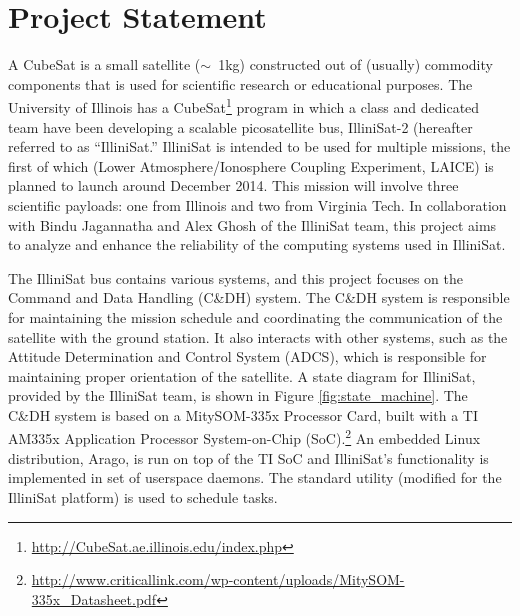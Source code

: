 \section{Project Statement}\label{sec:problem}

A CubeSat is a small satellite ($\sim$~1kg) constructed out of (usually)
commodity components that is used for scientific research or educational
purposes.  The University of Illinois has a
CubeSat\footnote{\url{http://CubeSat.ae.illinois.edu/index.php}} program in
which a class and dedicated team have been developing a scalable picosatellite
bus, IlliniSat-2 (hereafter referred to as ``IlliniSat.''  IlliniSat is intended
to be used for multiple missions, the first of which (Lower
Atmosphere/Ionosphere Coupling Experiment, LAICE) is planned to launch around
December 2014.  This mission will involve three scientific payloads: one from
Illinois and two from Virginia Tech.  In collaboration with Bindu Jagannatha and
Alex Ghosh of the IlliniSat team, this project aims to analyze and enhance the
reliability of the computing systems used in IlliniSat.

The IlliniSat bus contains various systems, and this project focuses on the
Command and Data Handling (C\&DH) system.  The C\&DH system is responsible for
maintaining the mission schedule and coordinating the communication of the
satellite with the ground station.  It also interacts with other systems, such
as the Attitude Determination and Control System (ADCS), which is responsible
for maintaining proper orientation of the satellite. A state diagram for
IlliniSat, provided by the IlliniSat team, is shown in Figure
\ref{fig:state_machine}. The C\&DH system is based on a MitySOM-335x Processor
Card, built with a TI AM335x Application Processor System-on-Chip
(SoC).\footnote{\url{http://www.criticallink.com/wp-content/uploads/MitySOM-335x_Datasheet.pdf}}
An embedded Linux distribution, Arago, is run on top of the TI SoC and
IlliniSat's functionality is implemented in set of userspace daemons. The
standard  utility (modified for the IlliniSat platform) is used to
schedule tasks.

